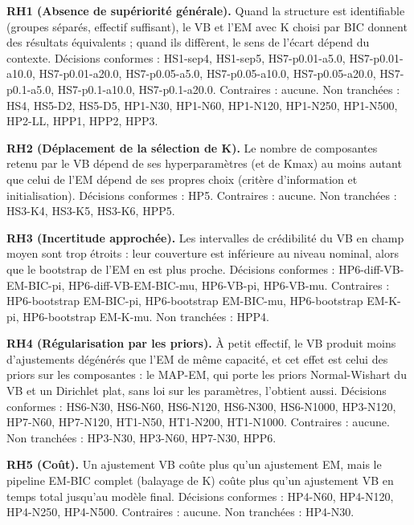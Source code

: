 \textbf{RH1 (Absence de supériorité générale).} Quand la structure est identifiable (groupes séparés, effectif suffisant), le VB et l'EM avec K choisi par BIC donnent des résultats équivalents ; quand ils diffèrent, le sens de l'écart dépend du contexte. Décisions conformes : HS1-sep4, HS1-sep5, HS7-p0.01-a5.0, HS7-p0.01-a10.0, HS7-p0.01-a20.0, HS7-p0.05-a5.0, HS7-p0.05-a10.0, HS7-p0.05-a20.0, HS7-p0.1-a5.0, HS7-p0.1-a10.0, HS7-p0.1-a20.0. Contraires : aucune. Non tranchées : HS4, HS5-D2, HS5-D5, HP1-N30, HP1-N60, HP1-N120, HP1-N250, HP1-N500, HP2-LL, HPP1, HPP2, HPP3.

\textbf{RH2 (Déplacement de la sélection de K).} Le nombre de composantes retenu par le VB dépend de ses hyperparamètres (et de Kmax) au moins autant que celui de l'EM dépend de ses propres choix (critère d'information et initialisation). Décisions conformes : HP5. Contraires : aucune. Non tranchées : HS3-K4, HS3-K5, HS3-K6, HPP5.

\textbf{RH3 (Incertitude approchée).} Les intervalles de crédibilité du VB en champ moyen sont trop étroits : leur couverture est inférieure au niveau nominal, alors que le bootstrap de l'EM en est plus proche. Décisions conformes : HP6-diff-VB-EM-BIC-pi, HP6-diff-VB-EM-BIC-mu, HP6-VB-pi, HP6-VB-mu. Contraires : HP6-bootstrap EM-BIC-pi, HP6-bootstrap EM-BIC-mu, HP6-bootstrap EM-K-pi, HP6-bootstrap EM-K-mu. Non tranchées : HPP4.

\textbf{RH4 (Régularisation par les priors).} À petit effectif, le VB produit moins d'ajustements dégénérés que l'EM de même capacité, et cet effet est celui des priors sur les composantes : le MAP-EM, qui porte les priors Normal-Wishart du VB et un Dirichlet plat, sans loi sur les paramètres, l'obtient aussi. Décisions conformes : HS6-N30, HS6-N60, HS6-N120, HS6-N300, HS6-N1000, HP3-N120, HP7-N60, HP7-N120, HT1-N50, HT1-N200, HT1-N1000. Contraires : aucune. Non tranchées : HP3-N30, HP3-N60, HP7-N30, HPP6.

\textbf{RH5 (Coût).} Un ajustement VB coûte plus qu'un ajustement EM, mais le pipeline EM-BIC complet (balayage de K) coûte plus qu'un ajustement VB en temps total jusqu'au modèle final. Décisions conformes : HP4-N60, HP4-N120, HP4-N250, HP4-N500. Contraires : aucune. Non tranchées : HP4-N30.
